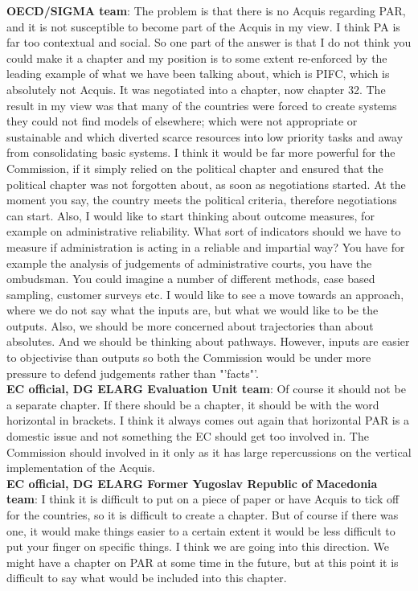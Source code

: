 \textbf{OECD/SIGMA team}: The problem is that there is no Acquis regarding PAR, and it is not susceptible to become part of the Acquis in my view. I think PA is far too contextual and social. So one part of the answer is that I do not think you could make it a chapter and my position is to some extent re-enforced by the leading example of what we have been talking about, which is PIFC, which is absolutely not Acquis. It was negotiated into a chapter, now chapter 32. The result in my view was that many of the countries were forced to create systems they could not find models of elsewhere; which were not appropriate or sustainable and which diverted scarce resources into low priority tasks and away from consolidating basic systems. I think it would be far more powerful for the Commission, if it simply relied on the political chapter and ensured that the political chapter was not forgotten about, as soon as negotiations started. At the moment you say, the country meets the political criteria, therefore negotiations can start. Also, I would like to start thinking about outcome measures, for example on administrative reliability. What sort of indicators should we have to measure if administration is acting in a reliable and impartial way? You have for example the analysis of judgements of administrative courts, you have the ombudsman. You could imagine a number of different methods, case based sampling, customer surveys etc. I would like to see a move towards an approach, where we do not say what the inputs are, but what we would like to be the outputs. Also, we should be more concerned about trajectories than about absolutes. And we should be thinking about pathways. However, inputs are easier to objectivise than outputs so both the Commission would be under more pressure to defend judgements rather than "'facts"'. \\
\textbf{EC official, DG ELARG Evaluation Unit team}: Of course it should not be a separate chapter. If there should be a chapter, it should be with the word horizontal in brackets. I think it always comes out again that horizontal PAR is a domestic issue and not something the EC should get too involved in. The Commission should involved in it only as it has large repercussions on the vertical implementation of the Acquis.  \\
\textbf{EC official, DG ELARG Former Yugoslav Republic of Macedonia team}: I think it is difficult to put on a piece of paper or have Acquis to tick off for the countries, so it is difficult to create a chapter. But of course if there was one, it would make things easier to a certain extent it would be less difficult to put your finger on specific things. I think we are going into this direction. We might have a chapter on PAR at some time in the future, but at this point it is difficult to say what would be included into this chapter. \\

